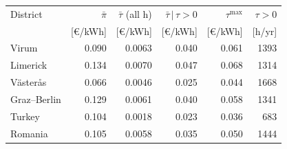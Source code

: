 \begin{tabular}{lrrrrr}
\toprule
District & $\bar\pi$ & $\bar\tau$ (all h) & $\bar\tau\,|\,\tau>0$ & $\tau^{\max}$ & $\tau>0$ \\
 & [\euro/kWh] & [\euro/kWh] & [\euro/kWh] & [\euro/kWh] & [h/yr] \\
\midrule
Virum & 0.090 & 0.0063 & 0.040 & 0.061 & 1393 \\
Limerick & 0.134 & 0.0070 & 0.047 & 0.068 & 1314 \\
V\"aster\aa s & 0.066 & 0.0046 & 0.025 & 0.044 & 1668 \\
Graz--Berlin & 0.129 & 0.0061 & 0.040 & 0.058 & 1341 \\
Turkey & 0.104 & 0.0018 & 0.023 & 0.036 & 683 \\
Romania & 0.105 & 0.0058 & 0.035 & 0.050 & 1444 \\
\bottomrule
\end{tabular}
